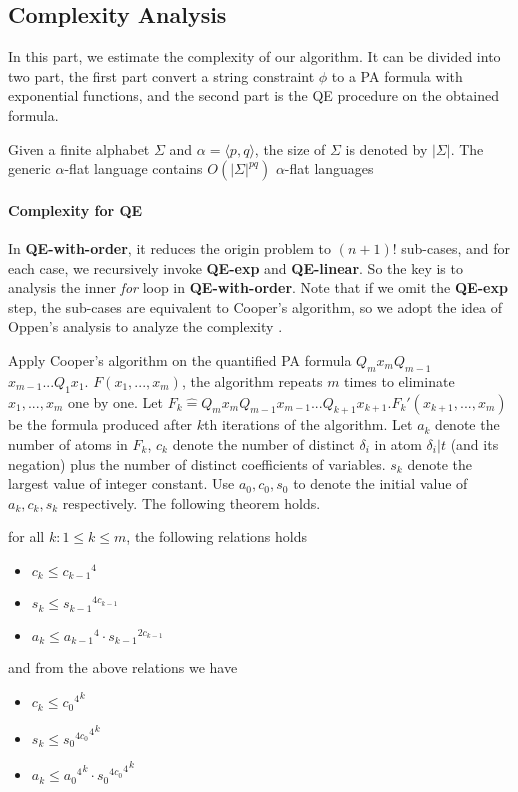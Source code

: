 \documentclass[runningheads]{llncs}
\newcommand{\Def}{\hat{=}}
\begin{document}
\subsection{Complexity Analysis}

In this part, we estimate the complexity of our algorithm.
It can be divided into two part, 
the first part convert a string constraint $\phi$ to a PA formula with exponential functions,
and the second part is the QE procedure on the obtained formula.

Given a finite alphabet $\Sigma$ and $\alpha=\langle p,q \rangle$, the size of $\Sigma$ is denoted by
$|\Sigma|$. 
The generic $\alpha$-flat language contains $O(|\Sigma|^{pq})$ $\alpha$-flat languages


\paragraph{Complexity for QE}
In \textbf{QE-with-order},
it reduces the origin problem to $(n+1)!$ sub-cases,
and for each case,
we recursively invoke \textbf{QE-exp} and \textbf{QE-linear}.
So the key is to analysis the inner \textit{for}
loop in \textbf{QE-with-order}.
Note that if we omit the \textbf{QE-exp} step,
the sub-cases are equivalent to Cooper's algorithm,
so we adopt the idea of Oppen's analysis to analyze the complexity
\cite{Oppen}.


Apply Cooper's algorithm on the quantified PA formula 
$Q_m x_m Q_{m-1}$ 
$x_{m-1} ... Q_1 x_1. $
$F(x_1,...,x_m)$,
the algorithm repeats $m$ times to eliminate
$x_1,...,x_m$ one by one.
Let $F_k \Def Q_m x_m Q_{m-1} 
x_{m-1} ... Q_{k+1} x_{k+1}. F_k'(x_{k+1},...,x_m)$
be the formula produced after $k$th iterations of the algorithm. 
Let $a_k$ denote the number of atoms in $F_k$,
$c_k$ denote the number of distinct $\delta_i$ in atom $\delta_i | t$ (and its negation) plus the number of distinct coefficients of variables.
$s_k$ denote the largest value of integer constant.
Use $a_0,c_0,s_0$ to denote the initial value of $a_k,c_k,s_k$ respectively.
The following theorem holds.

\begin{theorem}
for all $k: 1\le k\le m$, the following relations holds
\begin{itemize}
    \item $c_k \le {c_{k-1}}^4$
    \item $s_k \le {s_{k-1}}^{4c_{k-1}}$
    \item $a_k \le {a_{k-1}}^4 \cdot {s_{k-1}}^{2c_{k-1}}$
\end{itemize}
and from the above relations we have 
\begin{itemize}
    \item $c_k \le {{c_0}^4}^k$
    \item $s_k \le {{{s_0}^{4c_0}}^4}^k$
    \item $a_k \le {{a_0}^4}^k \cdot {{{s_0}^{4c_0}}^4}^k$
\end{itemize}
\end{theorem}
\end{document}
